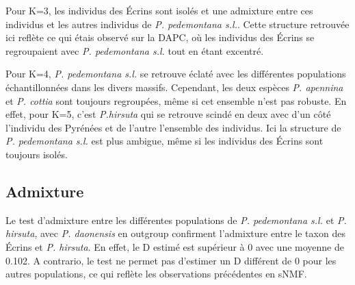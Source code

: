 Pour K=3, les individus des Écrins sont isolés et une admixture entre ces individus et les autres individus de \textit{P. pedemontana s.l.}. Cette structure retrouvée ici reflète ce qui étais observé sur la DAPC, où les individus des Écrins se regroupaient avec \textit{P. pedemontana s.l.} tout en étant excentré.

Pour K=4, \textit{P. pedemontana s.l.} se retrouve éclaté avec les différentes populations échantillonnées dans les divers massifs. Cependant, les deux espèces \textit{P. apennina} et \textit{P. cottia} sont toujours regroupées, même si cet ensemble n'est pas robuste. En effet, pour K=5, c'est \textit{P.hirsuta} qui se retrouve scindé en deux avec d'un côté l'individu des Pyrénées et de l'autre l'ensemble des individus. Ici la structure de \textit{P. pedemontana s.l.} est plus ambigue, même si les individus des Écrins sont toujours isolés.


\subsection{Admixture}

Le test d'admixture entre les différentes populations de \textit{P. pedemontana s.l.} et \textit{P. hirsuta}, avec \textit{P. daonensis} en outgroup confirment l'admixture entre le taxon des Écrins et \textit{P. hirsuta}. En effet, le D estimé est supérieur à 0 avec une moyenne de 0.102. A contrario, le test ne permet pas d'estimer un D différent de 0 pour les autres populations, ce qui reflète les observations précédentes en sNMF.


